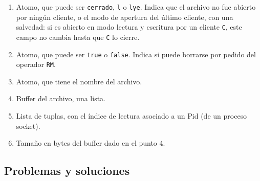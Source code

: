 \documentclass[a4paper, 8pt]{article}
\begin{document}
\begin{enumerate}
  \item Atomo, que puede ser \texttt{cerrado}, \texttt{l} o \texttt{lye}. Indica que el archivo no fue abierto por ningún cliente, o el modo de apertura del último cliente,
  con una salvedad:  si es abierto en modo lectura y escritura por un cliente \texttt{C}, este campo no cambia hasta que \texttt{C} lo cierre.
  \item Atomo, que puede ser \texttt{true} o \texttt{false}. Indica si puede borrarse por pedido del operador \texttt{RM}.
  \item Atomo, que tiene el nombre del archivo.
  \item Buffer del archivo, una lista.
  \item Lista de tuplas, con el índice de lectura asociado a un Pid (de un proceso socket).
  \item Tamaño en bytes del buffer dado en el punto 4.
\end{enumerate}

\subsection{Problemas y soluciones}
\end{document}
